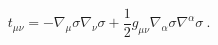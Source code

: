 \begin{equation}
t_{\mu \nu}=-\nabla_{\mu }\sigma \nabla_{\nu}\sigma +\frac{1}{2}
g_{\mu \nu} \nabla_{\alpha  }\sigma \nabla^{\alpha }\sigma~.
\label{7}\end{equation} 
